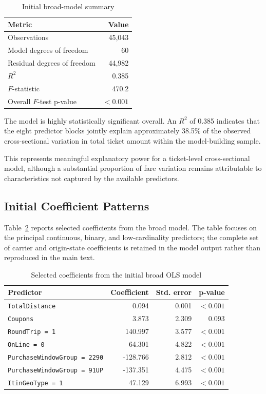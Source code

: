 \documentclass[11pt,a4paper]{article}
\begin{document}
\begin{table}[H]
\centering
\caption{Initial broad-model summary}
\label{tab:broad-model-summary}
\begin{tabular}{lr}
\toprule
\textbf{Metric} & \textbf{Value} \\
\midrule
Observations & 45,043 \\
Model degrees of freedom & 60 \\
Residual degrees of freedom & 44,982 \\
$R^2$ & 0.385 \\
$F$-statistic & 470.2 \\
Overall $F$-test p-value & $<0.001$ \\
\bottomrule
\end{tabular}
\end{table}

The model is highly statistically significant overall. An \(R^2\) of 0.385 indicates that the eight predictor blocks jointly explain approximately 38.5\% of the observed cross-sectional variation in total ticket amount within the model-building sample.

This represents meaningful explanatory power for a ticket-level cross-sectional model, although a substantial proportion of fare variation remains attributable to characteristics not captured by the available predictors.

\subsection{Initial Coefficient Patterns}

Table~\ref{tab:broad-key-coefficients} reports selected coefficients from the broad model. The table focuses on the principal continuous, binary, and low-cardinality predictors; the complete set of carrier and origin-state coefficients is retained in the model output rather than reproduced in the main text.

\begin{table}[H]
\centering
\caption{Selected coefficients from the initial broad OLS model}
\label{tab:broad-key-coefficients}
\begin{tabular}{lrrr}
\toprule
\textbf{Predictor} & \textbf{Coefficient} & \textbf{Std. error} & \textbf{p-value} \\
\midrule
\texttt{TotalDistance} & 0.094 & 0.001 & $<0.001$ \\
\texttt{Coupons} & 3.873 & 2.309 & 0.093 \\
\texttt{RoundTrip = 1} & 140.997 & 3.577 & $<0.001$ \\
\texttt{OnLine = 0} & 64.301 & 4.822 & $<0.001$ \\
\texttt{PurchaseWindowGroup = 2290} & -128.766 & 2.812 & $<0.001$ \\
\texttt{PurchaseWindowGroup = 91UP} & -137.351 & 4.475 & $<0.001$ \\
\texttt{ItinGeoType = 1} & 47.129 & 6.993 & $<0.001$ \\
\bottomrule
\end{tabular}
\end{table}
\end{document}
